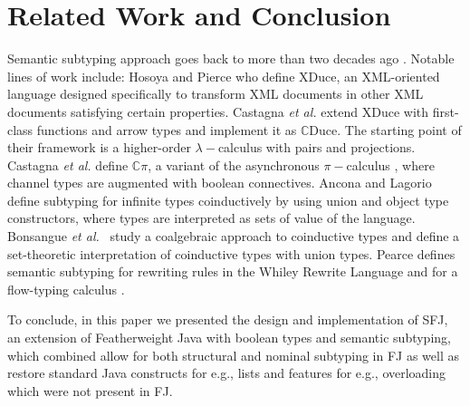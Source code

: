\documentclass[runningheads]{llncs}
\begin{document}
\section{Related Work and Conclusion}
\label{sec:conclusion}
Semantic subtyping approach goes back to more than two decades ago \cite{Aiken,Damm}.
Notable lines of work include:
Hosoya and Pierce \cite{XML1,XML2,XML3} who define XDuce, an XML-oriented language designed specifically to transform XML documents in other XML documents satisfying certain properties.
Castagna \emph{et al.} \cite{gentle,Cas05,FCB08} extend XDuce with first-class functions and arrow types and implement it as $\mathbb{C}$Duce. The starting point of their framework is a higher-order $\lambda-$calculus with pairs and projections.
Castagna \emph{et al.} \cite{Cpi} define $\mathbb{C}\pi$, a variant of the asynchronous $\pi-$calculus \cite{sangiorgi}, where channel types are augmented with boolean connectives.
Ancona and Lagorio~\cite{AL10} define subtyping for infinite types coinductively by using union and object type constructors, where types are interpreted as sets of value of the language.
Bonsangue \emph{et al.}~\cite{BRABR14} study a coalgebraic approach to coinductive types and define a set-theoretic interpretation of coinductive types with union types.
Pearce \cite{Pearce19} defines semantic subtyping for rewriting rules in the Whiley Rewrite Language and for a flow-typing calculus  \cite{Pearce13}.

To conclude, in this paper we presented the design and implementation of SFJ, an extension of Featherweight Java with boolean types and semantic subtyping, which combined allow for both structural and nominal subtyping in FJ as well as restore standard Java constructs for e.g., lists and features for e.g., overloading which were not present in FJ.

\newpage


\end{document}
